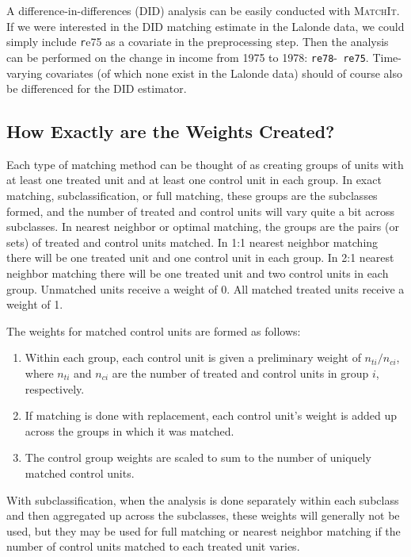 \documentclass[oneside,letterpaper,titlepage]{article}
\newcommand{\MatchIt}{\textsc{MatchIt}}
\begin{document}
A difference-in-differences (DID) analysis can be easily conducted
with \MatchIt.  If we were interested in the DID matching estimate in
the Lalonde data, we could simply include {\texttt re75} as a
covariate in the preprocessing step.  Then the analysis can be
performed on the change in income from 1975 to 1978: {\tt re78}-{\tt
  re75}.  Time-varying covariates (of which none exist in the Lalonde
data) should of course also be differenced for the DID estimator.

\subsection{How Exactly are the Weights Created?}
\label{subsec:weights}

Each type of matching method can be thought of as creating groups of
units with at least one treated unit and at least one control unit in
each group.  In exact matching, subclassification, or full matching,
these groups are the subclasses formed, and the number of treated and
control units will vary quite a bit across subclasses.  In nearest
neighbor or optimal matching, the groups are the pairs (or sets) of
treated and control units matched.  In 1:1 nearest neighbor matching
there will be one treated unit and one control unit in each group.  In
2:1 nearest neighbor matching there will be one treated unit and two
control units in each group.  Unmatched units receive a weight of 0.
All matched treated units receive a weight of 1.

The weights for matched control units are formed as follows:
\begin{enumerate}
\item Within each group, each control unit is given a preliminary
  weight of $n_{ti}/n_{ci}$, where $n_{ti}$ and $n_{ci}$ are the
  number of treated and control units in group $i$, respectively.
\item If matching is done with replacement, each control unit's weight
  is added up across the groups in which it was matched.
\item The control group weights are scaled to sum to the number of
  uniquely matched control units.
\end{enumerate}

With subclassification, when the analysis is done separately within
each subclass and then aggregated up across the subclasses, these
weights will generally not be used, but they may be used for full
matching or nearest neighbor matching if the number of control units
matched to each treated unit varies.
\end{document}
